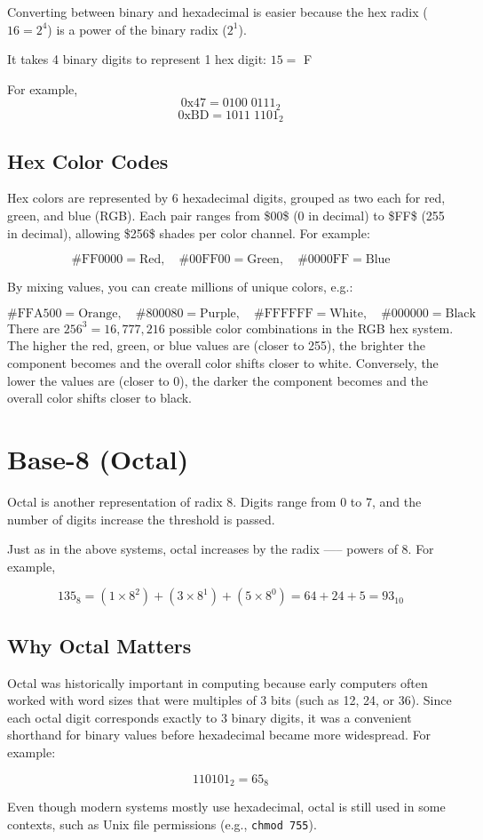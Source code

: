 Converting between binary and hexadecimal is easier because the hex radix ($16 = 2^4$) is a power of the binary radix ($2^1$). 

It takes 4 binary digits to represent 1 hex digit: $15 =$ F

For example,
\[0\text{x}47 = 0100 \; 0111_{2}\]
\[0\text{x}\text{BD} = 1011 \; 1101_{2}\]


\subsection{Hex Color Codes}
Hex colors are represented by 6 hexadecimal digits, grouped as two each for red, green, and blue (RGB). Each pair ranges from \$00\$ (0 in decimal) to \$FF\$ (255 in decimal), allowing \$256\$ shades per color channel. For example:

$$
\#\text{FF}0000 = \text{Red}, \quad\#00\text{FF}00 = \text{Green}, \quad \#0000\text{FF} = \text{Blue}
$$

By mixing values, you can create millions of unique colors, e.g.:

$$
\#\text{FFA}500 = \text{Orange}, \quad \#800080 = \text{Purple}, \quad \#\text{FFFFFF} = \text{White}, \quad \#000000 = \text{Black}
$$
There are $256^3 = 16{,}777{,}216$ possible color combinations in the RGB hex system. The higher the red, green, or blue values are (closer to 255), the brighter the component becomes and the overall color shifts closer to white. Conversely, the lower the values are (closer to 0), the darker the component becomes and the overall color shifts closer to black.

\section{Base-8 (Octal)}
Octal is another representation of radix 8. Digits range from 0 to 7, and the number of digits increase the threshold is passed.

Just as in the above systems, octal increases by the radix —-- powers of 8. For example,

$$
135_{8} = (1 \times 8^2) + (3\times 8^1) + (5\times 8^0) = 64 + 24 + 5 = 93_{10}
$$

\subsection{Why Octal Matters}
Octal was historically important in computing because early computers often worked with word sizes that were multiples of 3 bits (such as 12, 24, or 36). Since each octal digit corresponds exactly to 3 binary digits, it was a convenient shorthand for binary values before hexadecimal became more widespread. For example:

$$
110101_2 = 65_8
$$

Even though modern systems mostly use hexadecimal, octal is still used in some contexts, such as Unix file permissions (e.g., \texttt{chmod 755}).


